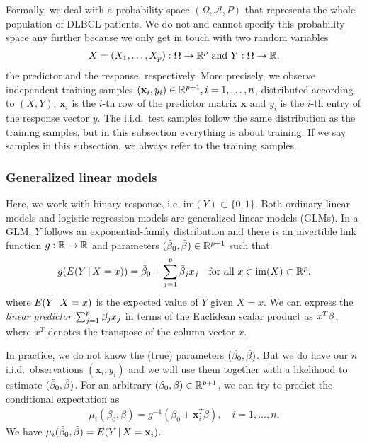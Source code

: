Formally, we deal with a probability space $(\Omega, \mathcal{A}, P)$ that represents the whole 
population of DLBCL patients. We do not and cannot specify this probability space any further because 
we only get in touch with two random variables 
\begin{align}
    X = (X_1, \ldots, X_p): \Omega \to \mathbb{R}^p \text{ and } Y: \Omega \to \mathbb{R},
\end{align}
the predictor and the response, respectively. More 
precisely, we observe independent training samples $(\mathbf{x}_i, y_i) \in \mathbb{R}^{p+1}, i = 1, \ldots, n$, 
distributed according to $(X, Y)$; $\mathbf{x}_i$ is the $i$-th row of the predictor matrix $\mathbf{x}$ and
$y_i$ is the $i$-th entry of the response vector $y$. The i.i.d.\ test samples follow the same 
distribution as the training samples, but in this subsection everything is about training. If we 
say samples in this subsection, we always refer to the training samples.

\subsubsection{Generalized linear models}\label{subsubsec:glm}

Here, we work with binary response, i.e. $\mathrm{im}(Y) \subset \{0, 1\}$. Both ordinary 
linear models and logistic regression models are generalized linear models (GLMs). In 
a GLM, $Y$ follows an exponential-family distribution and there is an invertible link function 
$g: \mathbb{R} \to \mathbb{R}$ and parameters $(\tilde{\beta}_0, \tilde{\beta}) \in \mathbb{R}^{p+1}$ such that
\begin{align}
    g(E(Y \,|\, X = x)) = \tilde{\beta}_0 + \sum_{j=1}^p \tilde{\beta}_j x_j \quad 
    \text{for all } x \in \mathrm{im}(X) \subset \mathbb{R}^p.
\end{align}
where $E(Y \,|\, X = x)$ is the expected value of $Y$ given $X = x$. We can express the 
\textit{linear predictor} $\sum_{j=1}^p \tilde{\beta}_j x_j$ in terms of the Euclidean scalar product 
as $x^T \tilde{\beta}$, where $x^T$ denotes the transpose of the column vector $x$. 

In practice, we do not know the (true) parameters
$(\tilde{\beta}_0, \tilde{\beta})$. But we do have our $n$ i.i.d.\ observations $(\mathbf{x}_i, y_i)$
and we will use them together with a likelihood to estimate $(\tilde{\beta}_0, \tilde{\beta})$. For an 
arbitrary $(\beta_0, \beta) \in \mathbb{R}^{p+1}$, we can try to predict the conditional expectation as
\begin{align}\label{eq:glm-mu}
    \mu_i(\beta_0, \beta) = g^{-1}(\beta_0 + \mathbf{x}_i^T \beta), \quad i = 1, \ldots, n.
\end{align}
We have $\mu_i(\tilde{\beta}_0, \tilde{\beta}) = E(Y \,|\, X = \mathbf{x}_i)$.

